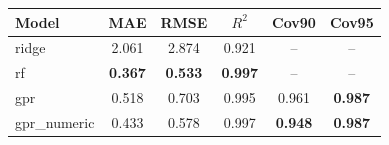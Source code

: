 \begin{tabular}{lccccc}
\toprule
\textbf{Model} & \textbf{MAE} & \textbf{RMSE} & \textbf{$R^2$} & \textbf{Cov90} & \textbf{Cov95} \\
\midrule
ridge & 2.061 & 2.874 & 0.921 & -- & -- \\
rf & \textbf{0.367} & \textbf{0.533} & \textbf{0.997} & -- & -- \\
gpr & 0.518 & 0.703 & 0.995 & 0.961 & \textbf{0.987} \\
gpr\_numeric & 0.433 & 0.578 & 0.997 & \textbf{0.948} & \textbf{0.987} \\
\bottomrule
\end{tabular}